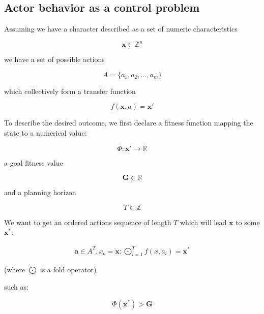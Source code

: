 \documentclass[12pt, a4paper]{article}
\begin{document}
	\subsection{Actor behavior as a control problem}

	Assuming we have a character described as a set of numeric characteristics
	
	\begin{equation}
		\mathbf{x} \in \mathbb{Z}^n
	\end{equation}
	
	we have a set of possible actions
	
	\begin{equation}
		A = \{a_1, a_2,\ldots, a_m\}
	\end{equation}
	
	which collectively form a transfer function
	
	\begin{equation}\label{definitions:transfer-function}
		f(\mathbf{x}, a) = \mathbf{x}'
	\end{equation}

	To describe the desired outcome, we first declare a fitness function mapping the state to a numerical value:
	
	\begin{equation}
		\Phi : \mathbf{x}' \rightarrow \mathbb{R}
	\end{equation} 
	
	a goal fitness value 
	
	\begin{equation}
		\mathbf{G} \in \mathbb{R}
	\end{equation}
	
	and a planning horizon
	
	\begin{equation}
		T \in \mathbb{Z}
	\end{equation}
	
	We want to get an ordered actions sequence of length $T$ which will lead $\mathbf{x}$ to some $\mathbf{x}^*$:
	
	\begin{eqnarray}\label{definitions:fold}
		\mathbf{a} \in A^T, x_o = \mathbf{x}: \bigodot_{i=1}^{T} f(x, a_i) = \mathbf{x}^*
	\end{eqnarray}
	
	(where $\bigodot$ is a fold operator)
	
	such as:
	
	\begin{equation}
		\Phi(\mathbf{x}^*) > \mathbf{G}
	\end{equation}
	
\end{document}
